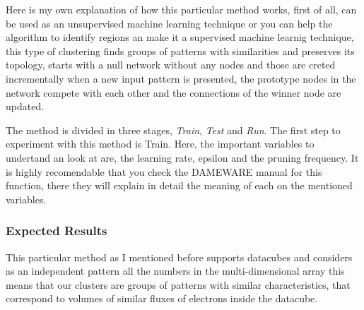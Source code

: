 \documentclass[11pt,fleqn]{book} %
\begin{document}
																																																																																																																																																																																																																					    Here is my own explanation of how this particular method works, first of all, can be used as an unsupervised machine learning technique or you can help the algorithm to identify regions an make it a supervised machine learnig technique, this type of clustering finds groups of patterns with similarities and preserves its topology, starts with a null network without any nodes and those are creted incrementally when a new input pattern is presented, the prototype nodes in the network compete with each other and the connections of the winner node are updated. 

																																																																																																																																																																																																																					    The method is divided in three stages, \emph{Train}, \emph{Test} and \emph{Run}.
																																																																																																																																																																																																																					    The first step to experiment with this method is Train. Here, the important variables to undertand an look at are, the learning rate, epsilon and the pruning frequency. It is highly recomendable that you check the DAMEWARE manual for this function, there they will explain in detail the meaning of each on the mentioned variables.
																																																																																																																																																																																																																					    \subsubsection{Expected Results}
																																																																																																																																																																																																																					    	This particular method as I mentioned before supports datacubes and considers as an independent pattern all the  numbers in the multi-dimensional array this means that our clusters are groups of patterns with similar characteristics, that correspond to volumes of similar fluxes of electrons inside the datacube.
																																																																																																																																																																																																																						    
\end{document}
